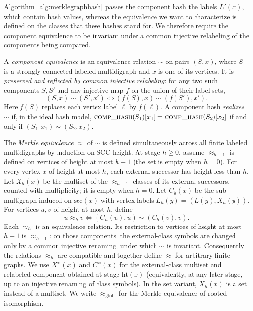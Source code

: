 \documentclass[twoside,leqno]{article}
\newcommand{\eqg}{\approx_{\mathrm{glob}}}
\newcommand{\hgt}{\mathrm{ht}}
\newcommand{\Scc}{\mathrm{scc}}
\begin{document}
Algorithm~\ref{alg:merklegraphhash} passes the component hash the labels $L'(x)$, which contain hash values, whereas the equivalence we want to characterize is defined on the classes that these hashes stand for. We therefore require the component equivalence to be invariant under a common injective relabeling of the components being compared.

\begin{defn}
\label{def:merkle-eq}
A \emph{component equivalence} is an equivalence relation $\sim$ on pairs $(S,x)$, where $S$ is a strongly connected labeled multidigraph and $x$ is one of its vertices. It is \emph{preserved and reflected by common injective relabeling}: for any two such components $S,S'$ and any injective map $f$ on the union of their label sets,
\[
(S,x)\sim(S',x')\iff(f(S),x)\sim(f(S'),x').
\]
Here $f(S)$ replaces each vertex label $\ell$ by $f(\ell)$. A component hash \emph{realizes} $\sim$ if, in the ideal hash model, $\textproc{comp\_hash}(S_1)[x_1]=\textproc{comp\_hash}(S_2)[x_2]$ if and only if $(S_1,x_1)\sim(S_2,x_2)$.

The \emph{Merkle equivalence} $\approx$ of $\sim$ is defined simultaneously across all finite labeled multidigraphs by induction on SCC height. At stage $h\geq 0$, assume $\approx_{h-1}$ is defined on vertices of height at most $h-1$ (the set is empty when $h=0$). For every vertex $x$ of height at most $h$, each external successor has height less than $h$. Let $X_h(x)$ be the multiset of the $\approx_{h-1}$-classes of its external successors, counted with multiplicity; it is empty when $h=0$. Let $C_h(x)$ be the sub-multigraph induced on $\Scc(x)$ with vertex labels $L_h(y)=(L(y),X_h(y))$. For vertices $u,v$ of height at most $h$, define
\[
u\approx_h v \iff (C_h(u),u)\sim(C_h(v),v).
\]
Each $\approx_h$ is an equivalence relation. Its restriction to vertices of height at most $h-1$ is $\approx_{h-1}$: on those components, the external-class symbols are changed only by a common injective renaming, under which $\sim$ is invariant. Consequently the relations $\approx_h$ are compatible and together define $\approx$ for arbitrary finite graphs. We use $X^{\approx}(x)$ and $C^{\approx}(x)$ for the external-class multiset and relabeled component obtained at stage $\hgt(x)$ (equivalently, at any later stage, up to an injective renaming of class symbols). In the set variant, $X_h(x)$ is a set instead of a multiset. We write $\eqg$ for the Merkle equivalence of rooted isomorphism.
\end{defn}
\end{document}
